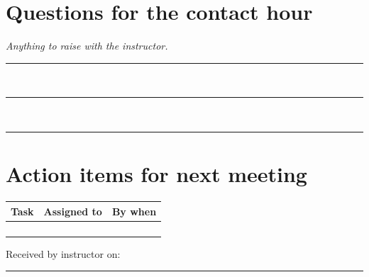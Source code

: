 \section*{Questions for the contact hour}
\textit{Anything to raise with the instructor.}
\vspace{0.4em}\\
\rule{\linewidth}{0.4pt}\\[1.4em]
\rule{\linewidth}{0.4pt}\\[1.4em]
\rule{\linewidth}{0.4pt}

\section*{Action items for next meeting}
\begin{tabularx}{\linewidth}{|X|L{4cm}|L{2.8cm}|}
  \hline
  Task & Assigned to & By when \\\hline
   & & \\\hline
   & & \\\hline
   & & \\\hline
   & & \\\hline
\end{tabularx}

\vspace{1em}
{\color{muted}\small Received by instructor on: \rule{6cm}{0.4pt}}


